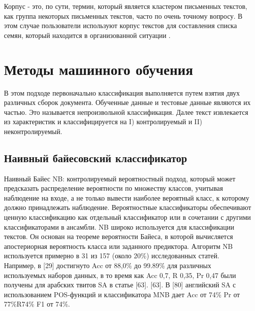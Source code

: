 Корпус - это, по сути, термин, который является кластером письменных текстов,
как группа некоторых письменных текстов, часто по очень точному вопросу. В этом
случае пользователи используют корпус текстов для составления списка семян,
который находится в организованной ситуации \cite{article18}.


\section{Методы машинного обучения}

В этом подходе первоначально классификация выполняется путем взятия двух
различных сборок документа. Обученные данные и тестовые данные являются их
частью. Это называется непроизвольной классификация. Далее текст извлекается из
характеристик и классифицируется на I) контролируемый и II) неконтролируемый.
\cite{article18}

\subsection{Наивный байесовский классификатор}

Наивный Байес NB: контролируемый вероятностный подход, который может предсказать
распределение вероятности по множеству классов, учитывая наблюдение на входе, а
не только вывести наиболее вероятный класс, к которому должно принадлежать
наблюдение. Вероятностные классификаторы обеспечивают ценную классификацию как
отдельный классификатор или в сочетании с другими классификаторами в ансамбли.
NB широко используется для классификации текстов. Он основан на теореме
вероятности Байеса, в которой вычисляется апостериорная вероятность класса или
заданного предиктора.  Алгоритм NB используется примерно в 31 из 157 (около
20\%) исследованных статей. Например, в [29] достигнуто Acc от 88,0\% до 99.89\%
для различных используемых наборов данных, в то время как Acc 0,7, R 0,35, Pr
0,47 были получены для арабских твитов SA в статье [63]. [63]. В [80] английский
SA с использованием POS-функций и классификатора MNB дает Acc от 74\% Pr от
77\%R74\% F1 от 74\%. \cite{article2}

